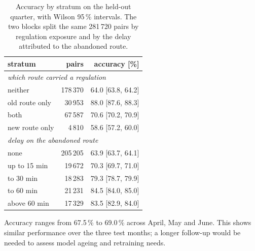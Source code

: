 \documentclass[a4paper,conference]{IEEEtran}
\begin{document}
\begin{table}[t]
\caption{Accuracy by stratum on the held-out quarter, with Wilson 95\,\%
intervals. The two blocks split the same 281\,720 pairs by regulation
exposure and by the delay attributed to the abandoned route.}
\label{tab:strata}
\centering\footnotesize
\begin{tabular}{lrr}
\toprule
stratum & pairs & accuracy [\%] \\
\midrule
\multicolumn{3}{l}{\emph{which route carried a regulation}} \\
\quad neither          & 178\,370 & 64.0 [63.8, 64.2] \\
\quad old route only   & 30\,953  & 88.0 [87.6, 88.3] \\
\quad both             & 67\,587  & 70.6 [70.2, 70.9] \\
\quad new route only   & 4\,810   & 58.6 [57.2, 60.0] \\
\midrule
\multicolumn{3}{l}{\emph{delay on the abandoned route}} \\
\quad none             & 205\,205 & 63.9 [63.7, 64.1] \\
\quad up to 15 min     & 19\,672  & 70.3 [69.7, 71.0] \\
\quad 15 to 30 min     & 18\,283  & 79.3 [78.7, 79.9] \\
\quad 30 to 60 min     & 21\,231  & 84.5 [84.0, 85.0] \\
\quad above 60 min     & 17\,329  & 83.5 [82.9, 84.0] \\
\bottomrule
\end{tabular}
\end{table}

Accuracy ranges from 67.5\,\% to 69.0\,\% across April, May and June.
This shows similar performance over the three test months; a longer
follow-up would be needed to assess model ageing and retraining needs.
\end{document}
